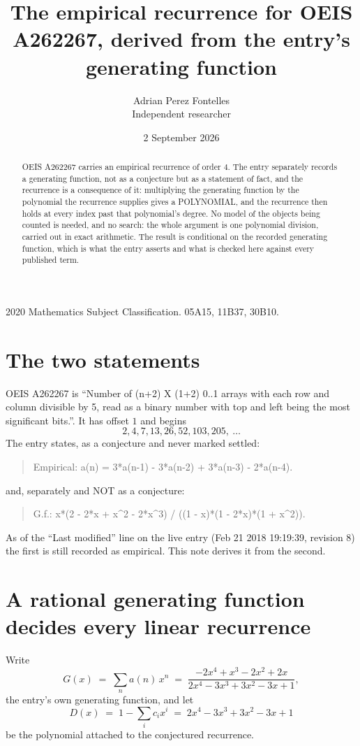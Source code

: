 \documentclass[11pt,a4paper]{article}
\title{The empirical recurrence for OEIS A262267, derived from the entry's generating function}
\author{Adrian Perez Fontelles\\ \small Independent researcher}
\date{2 September 2026}
\theoremstyle{plain}
\theoremstyle{definition}
\begin{document}
\maketitle

\begin{abstract}
OEIS A262267 carries an empirical recurrence of order $4$. The entry separately records a
generating function, not as a conjecture but as a statement of fact, and the recurrence is a
consequence of it: multiplying the generating function by the polynomial the recurrence
supplies gives a POLYNOMIAL, and the recurrence then holds at every index past that
polynomial's degree. No model of the objects being counted is needed, and no search: the
whole argument is one polynomial division, carried out in exact arithmetic. The result is
conditional on the recorded generating function, which is what the entry asserts and what is
checked here against every published term.
\end{abstract}

\noindent\small 2020 Mathematics Subject Classification. 05A15, 11B37, 30B10.\normalsize

\section{The two statements}

OEIS A262267 is ``Number of (n+2) X (1+2) 0..1 arrays with each row and column divisible by 5, read as a binary number with top and left being the most significant bits.''. It has offset $1$ and begins
\[
2, 4, 7, 13, 26, 52, 103, 205,\ \dots
\]
The entry states, as a conjecture and never marked settled:
\begin{quote}
Empirical: a(n) = 3*a(n-1) - 3*a(n-2) + 3*a(n-3) - 2*a(n-4).
\end{quote}
and, separately and NOT as a conjecture:
\begin{quote}
G.f.: x*(2 - 2*x + x\^{}2 - 2*x\^{}3) / ((1 - x)*(1 - 2*x)*(1 + x\^{}2)).
\end{quote}
As of the ``Last modified'' line on the live entry (Feb 21 2018 19:19:39, revision 8) the first is still
recorded as empirical. This note derives it from the second.

\section{A rational generating function decides every linear recurrence}

Write
\[
G(x)\;=\;\sum_{n}a(n)\,x^{n}\;=\;\frac{- 2 x^{4} + x^{3} - 2 x^{2} + 2 x}{2 x^{4} - 3 x^{3} + 3 x^{2} - 3 x + 1},
\]
the entry's own generating function, and let
\[
D(x)\;=\;1-\sum_i c_i x^{i}\;=\;2 x^{4} - 3 x^{3} + 3 x^{2} - 3 x + 1
\]
be the polynomial attached to the conjectured recurrence.
\end{document}
